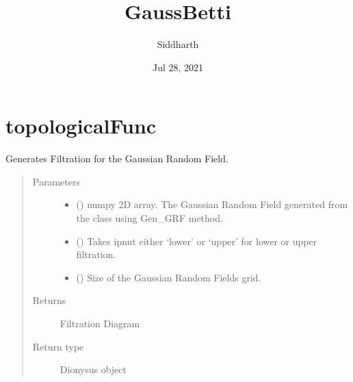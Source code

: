 \documentclass[letterpaper,10pt,english]{sphinxmanual}
\title{GaussBetti}
\date{Jul 28, 2021}
\author{Siddharth}
\begin{document}
\pagestyle{empty}
\sphinxmaketitle
\pagestyle{plain}
\sphinxtableofcontents
\pagestyle{normal}
\label{\detokenize{index::doc}}



\chapter{topologicalFunc}
\label{\detokenize{topologicalFunc:topologicalfunc}}\label{\detokenize{topologicalFunc:id1}}\label{\detokenize{topologicalFunc::doc}}\label{\detokenize{topologicalFunc:module-topologicalFunc}}

\begin{fulllineitems}
\label{\detokenize{topologicalFunc:topologicalFunc.GaussianFiltration}}
\sphinxAtStartPar
Generates Filtration for the Gaussian Random Field.
\begin{quote}\begin{description}
\item[{Parameters}] \leavevmode\begin{itemize}
\item {} 
\sphinxAtStartPar
{} () \textendash{} numpy 2\sphinxhyphen{}D array. The Gaussian Random Field generated from the class using Gen\_GRF method.

\item {} 
\sphinxAtStartPar
{} () \textendash{} Takes ipnut either ‘lower’ or ‘upper’ for lower or upper filtration.

\item {} 
\sphinxAtStartPar
{} () \textendash{} Size of the Gaussian Random Fields grid.

\end{itemize}

\item[{Returns}] \leavevmode
\sphinxAtStartPar
Filtration Diagram

\item[{Return type}] \leavevmode
\sphinxAtStartPar
Dionysus object

\end{description}\end{quote}

\end{fulllineitems}
\end{document}
